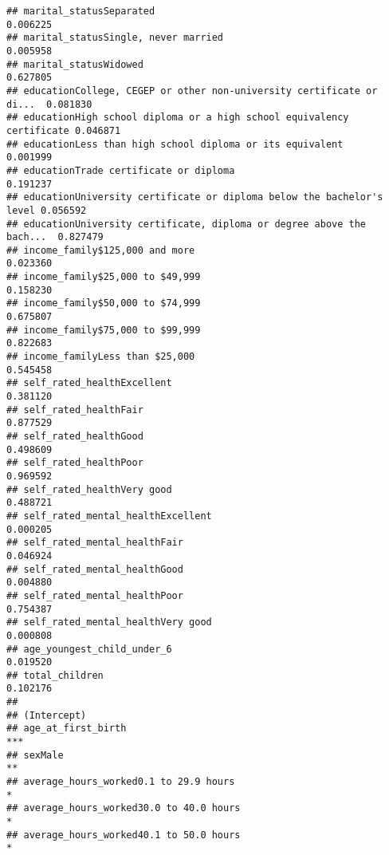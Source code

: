 \documentclass[
]{article}
\begin{document}
\begin{verbatim}
## marital_statusSeparated                                               0.006225
## marital_statusSingle, never married                                   0.005958
## marital_statusWidowed                                                 0.627805
## educationCollege, CEGEP or other non-university certificate or di...  0.081830
## educationHigh school diploma or a high school equivalency certificate 0.046871
## educationLess than high school diploma or its equivalent              0.001999
## educationTrade certificate or diploma                                 0.191237
## educationUniversity certificate or diploma below the bachelor's level 0.056592
## educationUniversity certificate, diploma or degree above the bach...  0.827479
## income_family$125,000 and more                                        0.023360
## income_family$25,000 to $49,999                                       0.158230
## income_family$50,000 to $74,999                                       0.675807
## income_family$75,000 to $99,999                                       0.822683
## income_familyLess than $25,000                                        0.545458
## self_rated_healthExcellent                                            0.381120
## self_rated_healthFair                                                 0.877529
## self_rated_healthGood                                                 0.498609
## self_rated_healthPoor                                                 0.969592
## self_rated_healthVery good                                            0.488721
## self_rated_mental_healthExcellent                                     0.000205
## self_rated_mental_healthFair                                          0.046924
## self_rated_mental_healthGood                                          0.004880
## self_rated_mental_healthPoor                                          0.754387
## self_rated_mental_healthVery good                                     0.000808
## age_youngest_child_under_6                                            0.019520
## total_children                                                        0.102176
##                                                                          
## (Intercept)                                                              
## age_at_first_birth                                                    ***
## sexMale                                                               ** 
## average_hours_worked0.1 to 29.9 hours                                 *  
## average_hours_worked30.0 to 40.0 hours                                *  
## average_hours_worked40.1 to 50.0 hours                                *  

\end{verbatim}
\end{document}
